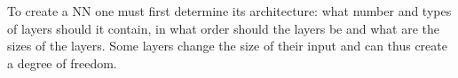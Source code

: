 \documentclass[../thesis.tex]{subfiles}
\begin{document}



To create a NN one must first determine its architecture: what number and types of layers should it contain, in what order should the layers be and what are the sizes of the layers. Some layers change the size of their input and can thus create a degree of freedom. 

\end{document}
